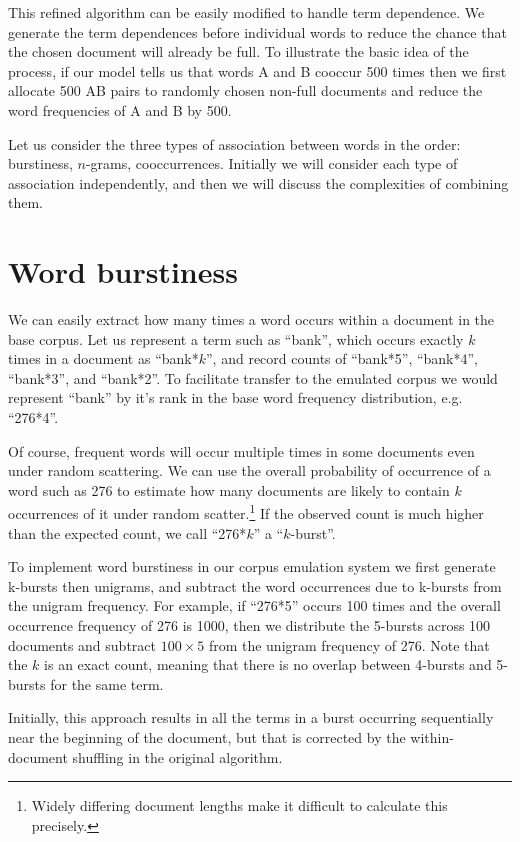 \documentclass[11pt]{report}
\begin{document}
This refined algorithm can be easily modified to handle term
dependence.  We generate the term dependences before individual words
to reduce the chance that the chosen document will already be full.
To illustrate the basic idea of the process, if our model tells us
that words A and B cooccur 500 times then we first allocate 500 AB
pairs to randomly chosen non-full documents and reduce the word
frequencies of A and B by 500.

Let us consider the three types of association between words in the
order: burstiness, $n$-grams, cooccurrences.   Initially we will
consider each type of association independently, and then we will
discuss the complexities of combining them.

\section{Word burstiness}
We can easily extract how many times a word occurs within a
document in the base corpus. Let us represent a term such as
``bank'', which occurs exactly $k$ times in a document as
``bank*$k$'', and record counts of ``bank*5'', ``bank*4'', ``bank*3'',
and ``bank*2''.   To facilitate transfer to the emulated corpus
we would represent ``bank'' by it's rank in the base word frequency
distribution, e.g. ``276*4''.

Of course, frequent words will occur multiple times in some documents
even under random scattering.  We can use the overall probability of
occurrence of a word such as 276 to estimate how many documents are
likely to contain $k$ occurrences of it under random
scatter.\footnote{Widely differing document lengths make it difficult
  to calculate this precisely.}
  If the observed count is much higher than the expected count, we call
``276*$k$'' a ``$k$-burst''.    

To implement word burstiness in our corpus emulation system
we first generate k-bursts then unigrams, and
subtract the word occurrences due to k-bursts from the unigram
frequency.  For example, if ``276*5'' occurs 100 times and the overall
occurrence frequency of 276 is 1000, then we distribute the 5-bursts
across 100 documents and subtract $100 \times 5$ from the unigram
frequency of 276.  Note that the $k$ is an exact count, meaning that
there is no overlap between 4-bursts and 5-bursts for the same term.

Initially, this approach results in all the terms in a burst occurring
sequentially near the beginning of the document, but that is corrected
by the within-document shuffling in the original algorithm.
\end{document}
